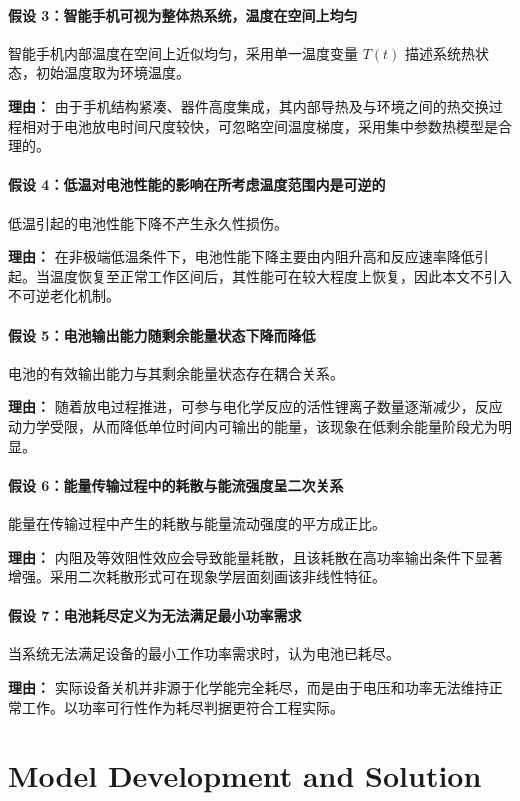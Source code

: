 \documentclass[11pt]{article}
\begin{document}
\paragraph{假设 3：智能手机可视为整体热系统，温度在空间上均匀}
智能手机内部温度在空间上近似均匀，采用单一温度变量 $T(t)$ 描述系统热状态，初始温度取为环境温度。

\textbf{理由：}
由于手机结构紧凑、器件高度集成，其内部导热及与环境之间的热交换过程相对于电池放电时间尺度较快，可忽略空间温度梯度，采用集中参数热模型是合理的。

\paragraph{假设 4：低温对电池性能的影响在所考虑温度范围内是可逆的}
低温引起的电池性能下降不产生永久性损伤。

\textbf{理由：}
在非极端低温条件下，电池性能下降主要由内阻升高和反应速率降低引起。当温度恢复至正常工作区间后，其性能可在较大程度上恢复，因此本文不引入不可逆老化机制。

\paragraph{假设 5：电池输出能力随剩余能量状态下降而降低}
电池的有效输出能力与其剩余能量状态存在耦合关系。

\textbf{理由：}
随着放电过程推进，可参与电化学反应的活性锂离子数量逐渐减少，反应动力学受限，从而降低单位时间内可输出的能量，该现象在低剩余能量阶段尤为明显。

\paragraph{假设 6：能量传输过程中的耗散与能流强度呈二次关系}
能量在传输过程中产生的耗散与能量流动强度的平方成正比。

\textbf{理由：}
内阻及等效阻性效应会导致能量耗散，且该耗散在高功率输出条件下显著增强。采用二次耗散形式可在现象学层面刻画该非线性特征。

\paragraph{假设 7：电池耗尽定义为无法满足最小功率需求}
当系统无法满足设备的最小工作功率需求时，认为电池已耗尽。

\textbf{理由：}
实际设备关机并非源于化学能完全耗尽，而是由于电压和功率无法维持正常工作。以功率可行性作为耗尽判据更符合工程实际。


\section{Model Development and Solution}
\end{document}
